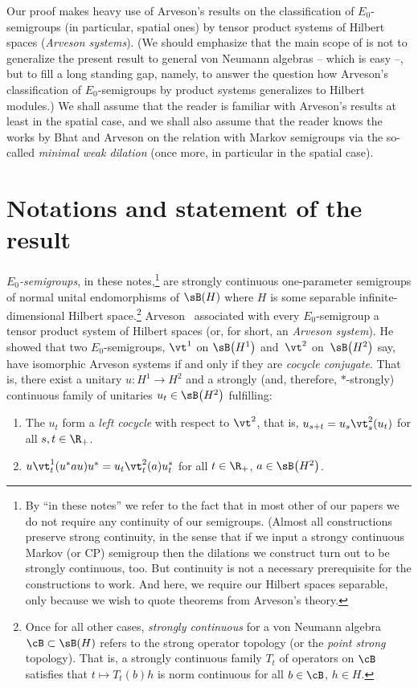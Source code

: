 Our proof makes heavy use of Arveson's results \cite{Arv89} on the classification of $E_0$-semi\-groups (in particular, spatial ones) by tensor product systems of Hilbert spaces ({\it Arveson systems}). (We should emphasize that the main scope of \cite{Ske16} is not to generalize the present result to general von Neumann algebras -- which is easy --, but to fill a long standing gap, namely, to answer the question how Arveson's classification of $E_0$-semigroups by product systems generalizes to Hilbert modules.) We shall assume that the reader is familiar with Arveson's results at least in the spatial case, and we shall also assume that the reader knows the works by Bhat \cite{Bha96} and Arveson \cite{Arv97a} on the relation with Markov semigroups via the so-called {\it minimal weak dilation} (once more, in particular in the spatial case).

\section{Notations and statement of the result}\label{notSEC}

\bemp \label{EPS}\emph{$E_0$-semigroups}, in these notes,\footnote{By ``in these notes'' we refer to the fact that in most other of our papers we do not require any continuity of our semigroups. (Almost all constructions preserve strong continuity, in the sense that if we input a strongy continuous Markov (or CP) semigroup then the dilations we construct turn out to be strongly continuous, too. But continuity is not a necessary prerequisite for the constructions to work. And here, we require our Hilbert spaces separable, only because we wish to quote theorems from Arveson's theory.} are strongly continuous one-parameter semigroups of normal unital endomorphisms of $\sB(H)$ where $H$ is some separable infinite-dimensional Hilbert space.\footnote{Once for all other cases, \emph{strongly continuous} for a von Neumann algebra $\cB\subset\sB(H)$ refers to the strong operator topology (or the {\it point strong} topology). That is, a strongly continuous family $T_t$ of operators on $\cB$ satisfies that $t\mapsto T_t(b)h$ is norm continuous for all $b\in\cB$, $h\in H$.}
Arveson~\cite{Arv89} associated with every $E_0$-semigroup a tensor product system of Hilbert spaces (or, for short, an \emph{Arveson system}). He showed that two $E_0$-semigroups, $\vt^1$ on $\sB\big(H^1\big)$ and~$\vt^2$ on~$\sB\big(H^2\big)$ say, have isomorphic Arveson systems if and only if they are \emph{cocycle conjugate}. That is, there exist a unitary $u\colon H^1\rightarrow H^2$ and a strongly (and, therefore, $*$-strongly) continuous family of unitaries $u_t\in\sB\big(H^2\big)$ fulfilling:
\begin{enumerate}\itemsep=0pt
\item
The $u_t$ form a \emph{left cocycle} with respect to $\vt^2$, that is, $u_{s+t}=u_s\vt^2_s(u_t)$ for all $s,t\in\R_+$.

\item $u\vt^1_t(u^*au)u^*=u_t\vt^2_t(a)u_t^*$ for all $t\in\R_+$, $a\in\sB\big(H^2\big)$.
\end{enumerate}
\eemp

